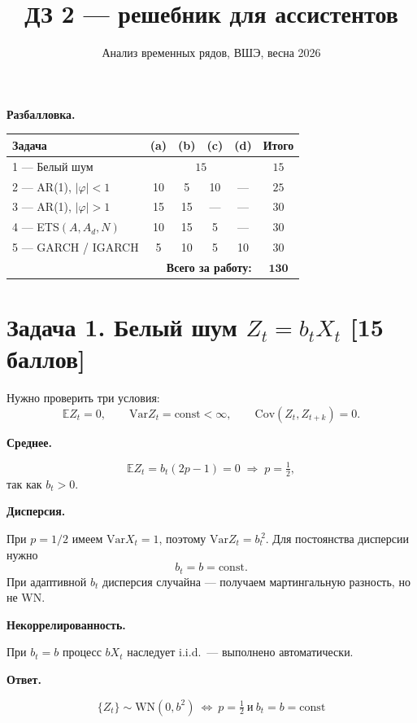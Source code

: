 \documentclass[11pt,a4paper]{article}
\title{ДЗ 2 --- решебник для ассистентов}
\author{Анализ временных рядов, ВШЭ, весна 2026}
\date{}
\newcommand{\E}{\mathbb{E}}
\newcommand{\Var}{\mathrm{Var}}
\newcommand{\Cov}{\mathrm{Cov}}
\newcommand{\step}[1]{\medskip\noindent\textbf{#1}\par\nobreak\vspace{2pt}}
\begin{document}
\maketitle

\begin{center}
\textbf{Разбалловка.}\\[4pt]
\begin{tabular}{@{}l|cccc|c@{}}
\toprule
Задача & (a) & (b) & (c) & (d) & \textbf{Итого} \\
\midrule
1 --- Белый шум            & \multicolumn{4}{c|}{\(15\)} & \(15\) \\
2 --- AR(1), \(|\varphi|<1\) & 10 & 5  & 10 & ---   & \(25\) \\
3 --- AR(1), \(|\varphi|>1\) & 15 & 15 & ---& ---   & \(30\) \\
4 --- ETS\((A,A_d,N)\)        & 10 & 15 & 5  & ---   & \(30\) \\
5 --- GARCH / IGARCH          & 5  & 10 & 5  & 10    & \(30\) \\
\midrule
\multicolumn{5}{r|}{\textbf{Всего за работу:}} & \(\mathbf{130}\) \\
\bottomrule
\end{tabular}
\end{center}

\section*{Задача 1. Белый шум \texorpdfstring{$Z_t=b_tX_t$}{} \hfill \normalsize[15 баллов]}

Нужно проверить три условия:
\[
\E Z_t=0,\qquad \Var Z_t=\mathrm{const}<\infty,\qquad \Cov(Z_t,Z_{t+k})=0.
\]

\step{Среднее.}
\[
\E Z_t=b_t(2p-1)=0 \;\Longrightarrow\; p=\tfrac12,
\]
так как \(b_t>0\).

\step{Дисперсия.}
При \(p=1/2\) имеем \(\Var X_t=1\), поэтому \(\Var Z_t=b_t^{\,2}\). Для постоянства дисперсии нужно
\[
b_t=b=\mathrm{const}.
\]
При адаптивной \(b_t\) дисперсия случайна --- получаем мартингальную разность, но не WN.

\step{Некоррелированность.}
При \(b_t=b\) процесс \(bX_t\) наследует i.i.d.\ --- выполнено автоматически.

\step{Ответ.}
\[
\boxed{\;\{Z_t\}\sim\mathrm{WN}(0,b^2)\ \Longleftrightarrow\ p=\tfrac12\ \text{и}\ b_t=b=\mathrm{const}\;}
\]

\end{document}
